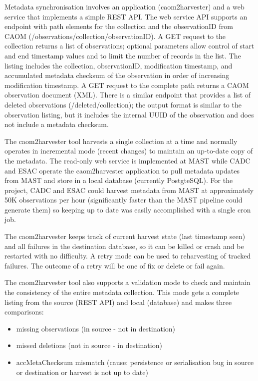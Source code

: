 \documentclass[11pt,twoside]{article}
\begin{document}
Metadata synchronisation involves an application (caom2harvester) and a web service that implements a simple REST \citep{REST} API. The web service API supports an endpoint with path elements for the collection and the observationID from CAOM (/observations/{collection}/{observationID}). A GET request to the collection returns a list of observations; optional parameters allow control of start and end timestamp values and to limit the number of records in the list. The listing includes the collection, observationID, modification timestamp, and accumulated metadata checksum of the observation  in order of increasing modification timestamp. A GET request to the complete path returns a CAOM  observation document (XML). There is a similar endpoint that provides a list of deleted observations (/deleted/{collection}); the output format is similar to the observation listing, but it includes the internal UUID of the observation and does not include a metadata checksum.

The caom2harvester tool harvests a single collection at a time and normally operates in incremental mode (recent changes) to maintain an up-to-date copy of the metadata. The read-only web service is implemented at MAST while CADC and ESAC operate the caom2harvester application to pull metadata updates from MAST and store in a local database (currently PostgteSQL). For the project, CADC and ESAC could harvest metadata from MAST at approximately 50K observations per hour (significantly faster than the MAST pipeline could generate them) so keeping up to date was easily accomplished with a single cron job.

The caom2harvester keeps track of current harvest state (last timestamp seen) and all failures in the destination database, so it can be killed or crash and be restarted with no difficulty. A retry mode can be used to reharvesting of tracked failures. The outcome of a retry will be one of fix or delete or fail again.

The caom2harvester tool also supports a validation mode to check and maintain the consistency of the entire metadata collection. This mode gets a complete listing from the source (REST API) and local (database) and makes three comparisons:
\begin{itemize}
\item{missing observations (in source - not in destination)}
\item{missed deletions (not in source - in destination)}
\item{accMetaChecksum mismatch (cause: persistence or serialisation bug in source or destination or harvest is not up to date)}
\end{itemize}
\end{document}
